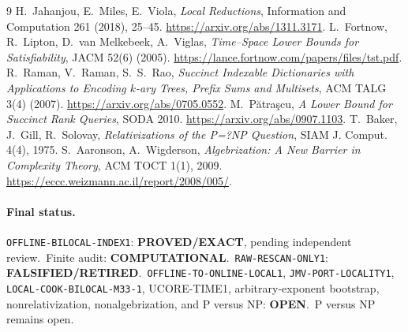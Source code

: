 \documentclass[11pt]{article}
\newcommand{\EXACT}{\textbf{PROVED/EXACT}}
\newcommand{\COMP}{\textbf{COMPUTATIONAL}}
\newcommand{\OPEN}{\textbf{OPEN}}
\newcommand{\RETIRED}{\textbf{FALSIFIED/RETIRED}}
\begin{document}
\begin{thebibliography}{9}
 H.~Jahanjou, E.~Miles, E.~Viola,
\emph{Local Reductions}, Information and Computation 261 (2018), 25--45.
\url{https://arxiv.org/abs/1311.3171}.
 L.~Fortnow, R.~Lipton, D.~van Melkebeek, A.~Viglas,
\emph{Time--Space Lower Bounds for Satisfiability}, JACM 52(6) (2005).
\url{https://lance.fortnow.com/papers/files/tst.pdf}.
 R.~Raman, V.~Raman, S.~S.~Rao,
\emph{Succinct Indexable Dictionaries with Applications to Encoding
$k$-ary Trees, Prefix Sums and Multisets}, ACM TALG 3(4) (2007).
\url{https://arxiv.org/abs/0705.0552}.
 M.~P\u{a}tra\c{s}cu,
\emph{A Lower Bound for Succinct Rank Queries}, SODA 2010.
\url{https://arxiv.org/abs/0907.1103}.
 T.~Baker, J.~Gill, R.~Solovay,
\emph{Relativizations of the P=?NP Question}, SIAM J. Comput. 4(4), 1975.
 S.~Aaronson, A.~Wigderson,
\emph{Algebrization: A New Barrier in Complexity Theory}, ACM TOCT 1(1),
2009. \url{https://eccc.weizmann.ac.il/report/2008/005/}.
\end{thebibliography}

\paragraph{Final status.}
\texttt{OFFLINE-BILOCAL-INDEX1}: \EXACT, pending independent review.\
Finite audit: \COMP.\
\texttt{RAW-RESCAN-ONLY1}: \RETIRED.\
\texttt{OFFLINE-TO-ONLINE-LOCAL1}, \texttt{JMV-PORT-LOCALITY1},
\texttt{LOCAL-COOK-BILOCAL-M33-1}, UCORE-TIME1, arbitrary-exponent
bootstrap, nonrelativization, nonalgebrization, and P versus NP: \OPEN.\
P versus NP remains open.

\end{document}
